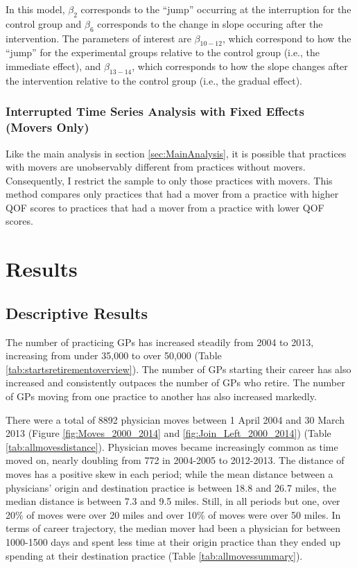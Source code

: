 \documentclass[11pt]{article}
\begin{document}
In this model, $\beta_{2}$ corresponds to the ``jump'' occurring at the interruption for the control group and $\beta_{6}$ corresponds to the change in slope occuring after the intervention. The parameters of interest are $\beta_{10-12}$, which correspond to how the ``jump'' for the experimental groups relative to the control group (i.e., the immediate effect), and $\beta_{13-14}$, which corresponds to how the slope changes after the intervention relative to the control group (i.e., the gradual effect).


\subsubsection{Interrupted Time Series Analysis with Fixed Effects (Movers Only)}

Like the main analysis in section \ref{sec:MainAnalysis}, it is possible that practices with movers are unobservably different from practices without movers. Consequently, I restrict the sample to only those practices with movers. This method compares only practices that had a mover from a practice with higher QOF scores to practices that had a mover from a practice with lower QOF scores.



\section{Results}

\subsection{Descriptive Results}

The number of practicing GPs has increased steadily from 2004 to 2013, increasing from under 35,000 to over 50,000 (Table \ref{tab:startsretirementoverview}). The number of GPs starting their career has also increased and consistently outpaces the number of GPs who retire. The number of GPs moving from one practice to another has also increased markedly.

There were a total of 8892 physician moves between 1 April 2004 and 30 March 2013 (Figure \ref{fig:Moves_2000_2014} and \ref{fig:Join_Left_2000_2014}) (Table \ref{tab:allmovesdistance}). Physician moves became increasingly common as time moved on, nearly doubling from 772 in 2004-2005 to 2012-2013. The distance of moves has a positive skew in each period; while the mean distance between a physicians' origin and destination practice is between 18.8 and 26.7 miles, the median distance is between 7.3 and 9.5 miles. Still, in all periods but one, over 20\% of moves were over 20 miles and over 10\% of moves were over 50 miles. In terms of career trajectory, the median mover had been a physician for between 1000-1500 days and spent less time at their origin practice than they ended up spending at their destination practice (Table \ref{tab:allmovessummary}).
\end{document}
